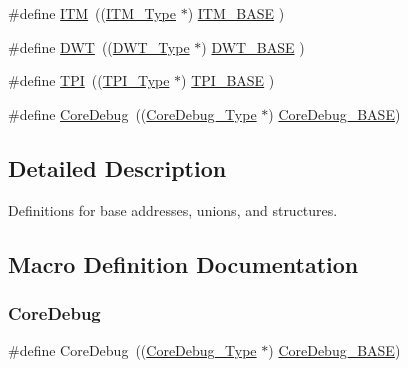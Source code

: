 \begin{DoxyCompactItemize}
\item 
\#define \mbox{\hyperlink{group___c_m_s_i_s__core__base_gabae7cdf882def602cb787bb039ff6a43}{I\+TM}}~((\mbox{\hyperlink{struct_i_t_m___type}{I\+T\+M\+\_\+\+Type}}       $\ast$)     \mbox{\hyperlink{group___c_m_s_i_s__core__base_gadd76251e412a195ec0a8f47227a8359e}{I\+T\+M\+\_\+\+B\+A\+SE}}      )
\item 
\#define \mbox{\hyperlink{group___c_m_s_i_s__core__base_gabbe5a060185e1d5afa3f85b14e10a6ce}{D\+WT}}~((\mbox{\hyperlink{struct_d_w_t___type}{D\+W\+T\+\_\+\+Type}}       $\ast$)     \mbox{\hyperlink{group___c_m_s_i_s__core__base_gafdab534f961bf8935eb456cb7700dcd2}{D\+W\+T\+\_\+\+B\+A\+SE}}      )
\item 
\#define \mbox{\hyperlink{group___c_m_s_i_s__core__base_ga8b4dd00016aed25a0ea54e9a9acd1239}{T\+PI}}~((\mbox{\hyperlink{struct_t_p_i___type}{T\+P\+I\+\_\+\+Type}}       $\ast$)     \mbox{\hyperlink{group___c_m_s_i_s__core__base_ga2b1eeff850a7e418844ca847145a1a68}{T\+P\+I\+\_\+\+B\+A\+SE}}      )
\item 
\#define \mbox{\hyperlink{group___c_m_s_i_s__core__base_gab6e30a2b802d9021619dbb0be7f5d63d}{Core\+Debug}}~((\mbox{\hyperlink{struct_core_debug___type}{Core\+Debug\+\_\+\+Type}} $\ast$)     \mbox{\hyperlink{group___c_m_s_i_s__core__base_ga680604dbcda9e9b31a1639fcffe5230b}{Core\+Debug\+\_\+\+B\+A\+SE}})
\end{DoxyCompactItemize}


\subsection{Detailed Description}
Definitions for base addresses, unions, and structures. 



\subsection{Macro Definition Documentation}
\mbox{\label{group___c_m_s_i_s__core__base_gab6e30a2b802d9021619dbb0be7f5d63d}} 
\subsubsection{\texorpdfstring{Core\+Debug}{CoreDebug}\hspace{0.1cm}{\footnotesize\ttfamily [1/4]}}
{\footnotesize\ttfamily \#define Core\+Debug~((\mbox{\hyperlink{struct_core_debug___type}{Core\+Debug\+\_\+\+Type}} $\ast$)     \mbox{\hyperlink{group___c_m_s_i_s__core__base_ga680604dbcda9e9b31a1639fcffe5230b}{Core\+Debug\+\_\+\+B\+A\+SE}})}

